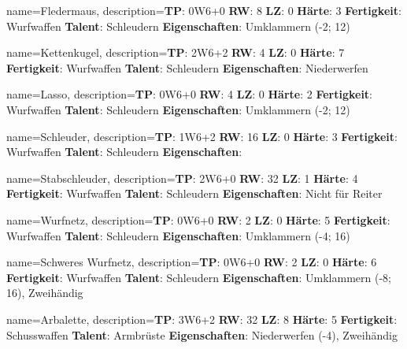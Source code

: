 {
    name={Fledermaus},
    description={\textbf{TP}: 0W6+0 \textbf{RW}: 8 \textbf{LZ}: 0 \textbf{Härte}: 3        \textbf{Fertigkeit}: Wurfwaffen \textbf{Talent}: Schleudern \textbf{{Eigenschaften}}: Umklammern (-2; 12)}
}



{
    name={Kettenkugel},
    description={\textbf{TP}: 2W6+2 \textbf{RW}: 4 \textbf{LZ}: 0 \textbf{Härte}: 7        \textbf{Fertigkeit}: Wurfwaffen \textbf{Talent}: Schleudern \textbf{{Eigenschaften}}: Niederwerfen}
}



{
    name={Lasso},
    description={\textbf{TP}: 0W6+0 \textbf{RW}: 4 \textbf{LZ}: 0 \textbf{Härte}: 2        \textbf{Fertigkeit}: Wurfwaffen \textbf{Talent}: Schleudern \textbf{{Eigenschaften}}: Umklammern (-2; 12)}
}



{
    name={Schleuder},
    description={\textbf{TP}: 1W6+2 \textbf{RW}: 16 \textbf{LZ}: 0 \textbf{Härte}: 3        \textbf{Fertigkeit}: Wurfwaffen \textbf{Talent}: Schleudern \textbf{{Eigenschaften}}: }
}



{
    name={Stabschleuder},
    description={\textbf{TP}: 2W6+0 \textbf{RW}: 32 \textbf{LZ}: 1 \textbf{Härte}: 4        \textbf{Fertigkeit}: Wurfwaffen \textbf{Talent}: Schleudern \textbf{{Eigenschaften}}: Nicht für Reiter}
}



{
    name={Wurfnetz},
    description={\textbf{TP}: 0W6+0 \textbf{RW}: 2 \textbf{LZ}: 0 \textbf{Härte}: 5        \textbf{Fertigkeit}: Wurfwaffen \textbf{Talent}: Schleudern \textbf{{Eigenschaften}}: Umklammern (-4; 16)}
}



{
    name={Schweres Wurfnetz},
    description={\textbf{TP}: 0W6+0 \textbf{RW}: 2 \textbf{LZ}: 0 \textbf{Härte}: 6        \textbf{Fertigkeit}: Wurfwaffen \textbf{Talent}: Schleudern \textbf{{Eigenschaften}}: Umklammern (-8; 16), Zweihändig}
}



{
    name={Arbalette},
    description={\textbf{TP}: 3W6+2 \textbf{RW}: 32 \textbf{LZ}: 8 \textbf{Härte}: 5        \textbf{Fertigkeit}: Schusswaffen \textbf{Talent}: Armbrüste \textbf{{Eigenschaften}}: Niederwerfen (-4), Zweihändig}
}



